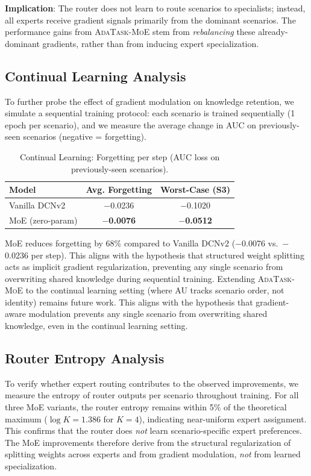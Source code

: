 \documentclass{article}
\begin{document}
\textbf{Implication}: The router does not learn to route scenarios to specialists; instead, all experts receive gradient signals primarily from the dominant scenarios.
The performance gains from \textsc{AdaTask-MoE} stem from \emph{rebalancing} these already-dominant gradients, rather than from inducing expert specialization.

\subsection{Continual Learning Analysis}
\label{sec:continual}

To further probe the effect of gradient modulation on knowledge retention, we simulate a sequential training protocol:
each scenario is trained sequentially (1 epoch per scenario), and we measure the average change in AUC on previously-seen scenarios (negative = forgetting).

\begin{table}[H]
\centering
\caption{Continual Learning: Forgetting per step (AUC loss on previously-seen scenarios).}
\label{tab:continual}
\begin{tabular}{lcc}
\toprule
\textbf{Model} & \textbf{Avg. Forgetting} & \textbf{Worst-Case (S3)} \\
\midrule
Vanilla DCNv2 & $-$0.0236 & $-$0.1020 \\
MoE (zero-param) & \textbf{$-$0.0076} & \textbf{$-$0.0512} \\
\bottomrule
\end{tabular}
\end{table}

MoE reduces forgetting by 68\% compared to Vanilla DCNv2 ($-$0.0076 vs.\ $-$0.0236 per step).
This aligns with the hypothesis that structured weight splitting acts as implicit gradient regularization, preventing any single scenario from overwriting shared knowledge during sequential training.
Extending \textsc{AdaTask-MoE} to the continual learning setting (where AU tracks scenario order, not identity) remains future work. This aligns with the hypothesis that gradient-aware modulation prevents any single scenario from overwriting shared knowledge, even in the continual learning setting.

\subsection{Router Entropy Analysis}
\label{sec:router}

To verify whether expert routing contributes to the observed improvements, we measure the entropy of router outputs per scenario throughout training.
For all three MoE variants, the router entropy remains within 5\% of the theoretical maximum ($\log K = 1.386$ for $K=4$), indicating near-uniform expert assignment.
This confirms that the router does \emph{not} learn scenario-specific expert preferences.
The MoE improvements therefore derive from the structural regularization of splitting weights across experts and from gradient modulation, \emph{not} from learned specialization.
\end{document}
